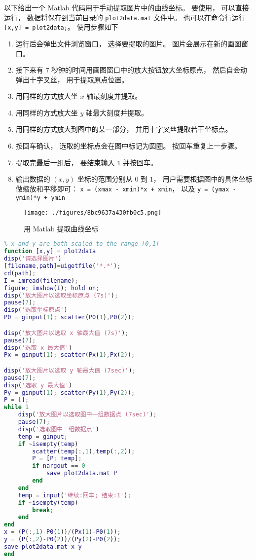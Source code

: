 

以下给出一个 Matlab 代码用于手动提取图片中的曲线坐标。 要使用， 可以直接运行， 数据将保存到当前目录的 \verb|plot2data.mat| 文件中。 也可以在命令行运行 \verb|[x,y] = plot2data;|。 使用步骤如下

\begin{enumerate}
\item 运行后会弹出文件浏览窗口， 选择要提取的图片。 图片会展示在新的画图窗口。
\item 接下来有 7 秒钟的时间用画图窗口中的放大按钮放大坐标原点， 然后自会动弹出十字叉丝， 用于提取原点位置。
\item 用同样的方式放大坐 $x$ 轴最刻度并提取。
\item 用同样的方式放大坐 $y$ 轴最大刻度并提取。
\item 用同样的方式放大到图中的某一部分， 并用十字叉丝提取若干坐标点。
\item 按回车确认， 选取的坐标点会在图中标记为圆圈。 按回车重复上一步骤。
\item 提取完最后一组后， 要结束输入 \verb|1| 并按回车。
\item 输出数据的 $(x, y)$ 坐标的范围分别从 $0$ 到 $1$， 用户需要根据图中的具体坐标做缩放和平移即可： \verb|x = (xmax - xmin)*x + xmin|， 以及 \verb|y = (ymax - ymin)*y + ymin|
\end{enumerate}

\begin{figure}[ht]
\centering
\texttt{[image: ./figures/8bc9637a430fb0c5.png]}
\caption{用 Matlab 提取曲线坐标} \label{fig_plt2xy_1}
\end{figure}

\begin{lstlisting}[language=matlab, caption=plot2data.m]
% Data Extractor for Plot
% x and y are both scaled to the range [0,1]
function [x,y] = plot2data
disp('请选择图片')
[filename,path]=uigetfile('*.*');
cd(path);
I = imread(filename);
figure; imshow(I); hold on;
disp('放大图片以选取坐标原点 (7s)');
pause(7);
disp('选取坐标原点')
P0 = ginput(1); scatter(P0(1),P0(2));

disp('放大图片以选取 x 轴最大值 (7s)');
pause(7);
disp('选取 x 最大值')
Px = ginput(1); scatter(Px(1),Px(2));

disp('放大图片以选取 y 轴最大值 (7sec)');
pause(7);
disp('选取 y 最大值')
Py = ginput(1); scatter(Py(1),Py(2));
P = [];
while 1
    disp('放大图片以选取图中一组数据点 (7sec)');
    pause(7);
    disp('选取图中一组数据点')
    temp = ginput;
    if ~isempty(temp)
        scatter(temp(:,1),temp(:,2));
        P = [P; temp];
        if nargout == 0
            save plot2data.mat P
        end
    end
    temp = input('继续:回车; 结束:1');
    if ~isempty(temp)
        break;
    end
end
x = (P(:,1)-P0(1))/(Px(1)-P0(1));
y = (P(:,2)-P0(2))/(Py(2)-P0(2));
save plot2data.mat x y
end
\end{lstlisting}
